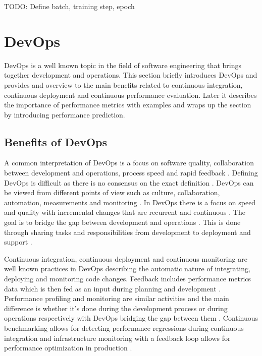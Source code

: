 TODO: Define batch, training step, epoch

\section{DevOps} %
\label{sec:devops}

DevOps is a well known topic in the field of software engineering that brings together development and operations. This section briefly introduces DevOps and provides and overview to the main benefits related to continuous integration, continuous deployment and continuous performance evaluation. Later it describes the importance of performance metrics with examples and wraps up the section by introducing performance prediction.

\subsection{Benefits of DevOps}

A common  interpretation of DevOps is a focus on software quality, collaboration between development and operations, process speed and rapid feedback \parencite{mishraDevOpsSoftwareQuality2020,wallerIncludingPerformanceBenchmarks2015, pereraImproveSoftwareQuality2017}. Defining DevOps is difficult as there is no consensus on the exact definition \parencite{smedsDevOpsDefinitionPerceived2015,mishraDevOpsSoftwareQuality2020}. DevOps can be viewed from different points of view such as culture, collaboration, automation, measurements and monitoring \parencite{mishraDevOpsSoftwareQuality2020, wallerIncludingPerformanceBenchmarks2015}. In DevOps there is a focus on speed and quality with incremental changes that are recurrent and continuous \parencite{mishraDevOpsSoftwareQuality2020}. The goal is to bridge the gap between development and operations \parencite{smedsDevOpsDefinitionPerceived2015}. This is done through sharing tasks and responsibilities from development to deployment and support \parencite{mishraDevOpsSoftwareQuality2020}.

Continuous integration, continuous deployment and continuous monitoring are well known practices in DevOps \parencite{wallerIncludingPerformanceBenchmarks2015} describing the automatic nature of integrating, deploying and monitoring code changes. Feedback includes performance metrics data which is then fed as an input during planning and development \parencite{smedsDevOpsDefinitionPerceived2015}. Performance profiling and monitoring are similar activities and the main difference is whether it's done during the development process or during operations respectively \parencite{wallerIncludingPerformanceBenchmarks2015} with DevOps bridging the gap between them \parencite{brunnertPerformanceorientedDevOpsResearch2015}. Continuous benchmarking allows for detecting performance regressions during continuous integration \parencite{wallerIncludingPerformanceBenchmarks2015} and infrastructure monitoring with a feedback loop allows for performance optimization in production \parencite{smedsDevOpsDefinitionPerceived2015}.

